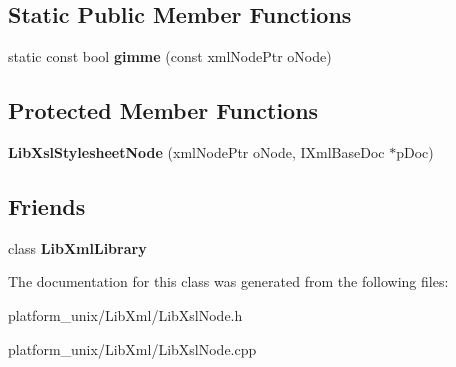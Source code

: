 \subsection*{\-Static \-Public \-Member \-Functions}
\begin{DoxyCompactItemize}
\item 
\hypertarget{classgeneral__server_1_1LibXslStylesheetNode_a74a03cbce956d8fd2324a43e5673e4a4}{static const bool {\bfseries gimme} (const xml\-Node\-Ptr o\-Node)}\label{classgeneral__server_1_1LibXslStylesheetNode_a74a03cbce956d8fd2324a43e5673e4a4}

\end{DoxyCompactItemize}
\subsection*{\-Protected \-Member \-Functions}
\begin{DoxyCompactItemize}
\item 
\hypertarget{classgeneral__server_1_1LibXslStylesheetNode_ab43793533ac5eab97b1552962020bf54}{{\bfseries \-Lib\-Xsl\-Stylesheet\-Node} (xml\-Node\-Ptr o\-Node, \-I\-Xml\-Base\-Doc $\ast$p\-Doc)}\label{classgeneral__server_1_1LibXslStylesheetNode_ab43793533ac5eab97b1552962020bf54}

\end{DoxyCompactItemize}
\subsection*{\-Friends}
\begin{DoxyCompactItemize}
\item 
\hypertarget{classgeneral__server_1_1LibXslStylesheetNode_ab76a8c8b514e08e13c811de729a94ce4}{class {\bfseries \-Lib\-Xml\-Library}}\label{classgeneral__server_1_1LibXslStylesheetNode_ab76a8c8b514e08e13c811de729a94ce4}

\end{DoxyCompactItemize}


\-The documentation for this class was generated from the following files\-:\begin{DoxyCompactItemize}
\item 
platform\-\_\-unix/\-Lib\-Xml/\-Lib\-Xsl\-Node.\-h\item 
platform\-\_\-unix/\-Lib\-Xml/\-Lib\-Xsl\-Node.\-cpp\end{DoxyCompactItemize}
